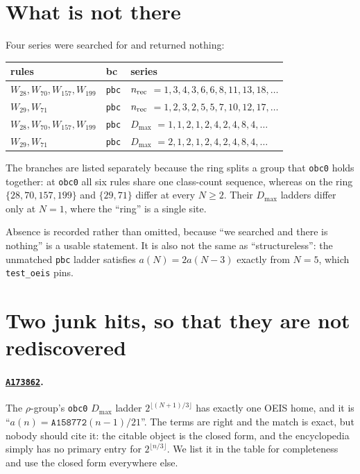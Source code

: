 \documentclass[11pt]{article}
\newcommand{\rt}[1]{\texttt{#1}}
\newcommand{\fn}[1]{\texttt{#1}}
\newcommand{\oeis}[1]{\href{https://oeis.org/#1}{\texttt{#1}}}
\theoremstyle{plain}
\begin{document}
\section{What is not there}

Four series were searched for and returned nothing:

\begin{center}
\small
\begin{tabular}{lll}
\toprule
rules & bc & series \\
\midrule
$W_{28}, W_{70}, W_{157}, W_{199}$ & \rt{pbc} & $n_{\rm rec}$
  $= 1,3,4,3,6,6,8,11,13,18,\ldots$ \\
$W_{29}, W_{71}$ & \rt{pbc} & $n_{\rm rec}$
  $= 1,2,3,2,5,5,7,10,12,17,\ldots$ \\
$W_{28}, W_{70}, W_{157}, W_{199}$ & \rt{pbc} & $D_{\max}$
  $= 1,1,2,1,2,4,2,4,8,4,\ldots$ \\
$W_{29}, W_{71}$ & \rt{pbc} & $D_{\max}$
  $= 2,1,2,1,2,4,2,4,8,4,\ldots$ \\
\bottomrule
\end{tabular}
\end{center}

\noindent The branches are listed separately because the ring splits a group
that \rt{obc0} holds together: at \rt{obc0} all six rules share one class-count
sequence, whereas on the ring $\{28,70,157,199\}$ and $\{29,71\}$ differ at
every $N\ge2$. Their $D_{\max}$ ladders differ only at $N=1$, where the
``ring'' is a single site.

Absence is recorded rather than omitted, because ``we searched and there is
nothing'' is a usable statement. It is also not the same as ``structureless'':
the unmatched \rt{pbc} ladder satisfies $a(N)=2a(N-3)$ exactly from $N=5$, which
\fn{test\_oeis} pins.

\section{Two junk hits, so that they are not rediscovered}

\paragraph{\oeis{A173862}.} The $\rho$-group's \rt{obc0} $D_{\max}$ ladder
$2^{\lfloor (N+1)/3\rfloor}$ has exactly one OEIS home, and it is
``$a(n)=\texttt{A158772}(n-1)/21$''. The terms are right and the match is exact,
but nobody should cite it: the citable object is the closed form, and the
encyclopedia simply has no primary entry for $2^{\lfloor n/3\rfloor}$. We list
it in the table for completeness and use the closed form everywhere else.
\end{document}
